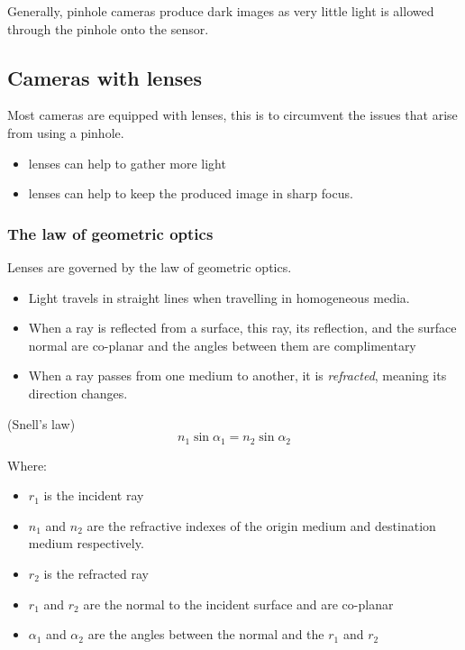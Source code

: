 \documentclass{article}
\begin{document}
Generally, pinhole cameras produce dark images as very little light is allowed through the pinhole onto the sensor.

\subsection{Cameras with lenses}

Most cameras are equipped with lenses, this is to circumvent the issues that arise from using a pinhole.

\begin{itemize}
  \item lenses can help to gather more light
  \item lenses can help to keep the produced image in sharp focus.
\end{itemize}

\subsubsection{The law of geometric optics}

Lenses are governed by the law of geometric optics.

\begin{itemize}
  \item Light travels in straight lines when travelling in homogeneous media.
  \item When a ray is reflected from a surface, this ray, its reflection, and the surface normal are co-planar and the angles between them are complimentary
        \item When a ray passes from one medium to another, it is \textit{refracted}, meaning its direction changes.
\end{itemize}



\begin{law}(Snell's law)
\[
  n_{1}\sin \alpha_{1} = n_{2}\sin \alpha_{2}
\]

Where:

\begin{itemize}
  \item $r_{1}$ is the incident ray
  \item $n_{1}$ and $n_{2}$ are the refractive indexes of the origin medium and destination medium respectively.
  \item $r_{2}$ is the refracted ray
  \item $r_{1}$ and $r_{2}$ are the normal to the incident surface and are co-planar
  \item $\alpha _{1}$ and $\alpha _{2}$ are the angles between the normal and the $r_{1}$ and $r_{2}$
\end{itemize}
\end{law}
\end{document}
